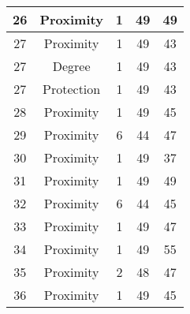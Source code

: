 \documentclass[results.tex]{subfiles}
\begin{document}
\begin{center}
\begin{tabular}{| c || c | c | c | c |}
            \hline
            26                      & Proximity                    & 1                      & 49                      & 49                   \\
            \hline
            27                      & Proximity                    & 1                      & 49                      & 43                   \\
            \hline
            27                      & Degree                       & 1                      & 49                      & 43                   \\
            \hline
            27                      & Protection                   & 1                      & 49                      & 43                   \\
            \hline
            28                      & Proximity                    & 1                      & 49                      & 45                   \\
            \hline
            29                      & Proximity                    & 6                      & 44                      & 47                   \\
            \hline
            30                      & Proximity                    & 1                      & 49                      & 37                   \\
            \hline
            31                      & Proximity                    & 1                      & 49                      & 49                   \\
            \hline
            32                      & Proximity                    & 6                      & 44                      & 45                   \\
            \hline
            33                      & Proximity                    & 1                      & 49                      & 47                   \\
            \hline
            34                      & Proximity                    & 1                      & 49                      & 55                   \\
            \hline
            35                      & Proximity                    & 2                      & 48                      & 47                   \\
            \hline
            36                      & Proximity                    & 1                      & 49                      & 45                   \\

\end{tabular}
\end{center}
\end{document}
